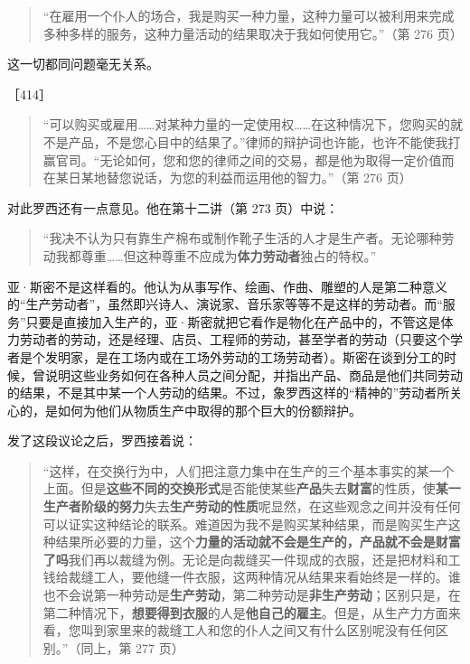 \begin{quote}“在雇用一个仆人的场合，我是购买一种力量，这种力量可以被利用来完成多种多样的服务，这种力量活动的结果取决于我如何使用它。”（第 276 页）\end{quote}

这一切都同问题毫无关系。

［414］

\begin{quote}“可以购买或雇用……对某种力量的一定使用权……在这种情况下，您购买的就不是产品，不是您心目中的结果了。”律师的辩护词也许能，也许不能使我打赢官司。“无论如何，您和您的律师之间的交易，都是他为取得一定价值而在某日某地替您说话，为您的利益而运用他的智力。”（第 276 页）\end{quote}

\fontbox{~\{}对此罗西还有一点意见。他在第十二讲（第 273 页）中说：

\begin{quote}“我决不认为只有靠生产棉布或制作靴子生活的人才是生产者。无论哪种劳动我都尊重……但这种尊重不应成为\textbf{体力劳动者}独占的特权。”\end{quote}

亚·斯密不是这样看的。他认为从事写作、绘画、作曲、雕塑的人是第二种意义的“生产劳动者”，虽然即兴诗人、演说家、音乐家等等不是这样的劳动者。而“服务”只要是直接加入生产的，亚·斯密就把它看作是物化在产品中的，不管这是体力劳动者的劳动，还是经理、店员、工程师的劳动，甚至学者的劳动（只要这个学者是个发明家，是在工场内或在工场外劳动的工场劳动者）。斯密在谈到分工的时候，曾说明这些业务如何在各种人员之间分配，并指出产品、商品是他们共同劳动的结果，不是其中某一个人劳动的结果。不过，象罗西这样的“精神的”劳动者所关心的，是如何为他们从物质生产中取得的那个巨大的份额辩护。\fontbox{\}~}

发了这段议论之后，罗西接着说：

\begin{quote}“这样，在交换行为中，人们把注意力集中在生产的三个基本事实的某一个上面。但是\textbf{这些不同的交换形式}是否能使某些\textbf{产品}失去\textbf{财富}的性质，使\textbf{某一生产者阶级的努力}失去\textbf{生产劳动的性质}呢显然，在这些观念之间并没有任何可以证实这种结论的联系。难道因为我不是购买某种结果，而是购买生产这种结果所必要的力量，这个\textbf{力量的活动就不会是生产的，产品就不会是财富了吗}我们再以裁缝为例。无论是向裁缝买一件现成的衣服，还是把材料和工钱给裁缝工人，要他缝一件衣服，这两种情况从结果来看始终是一样的。谁也不会说第一种劳动是\textbf{生产劳动}，第二种劳动是\textbf{非生产劳动}；区别只是，在第二种情况下，\textbf{想要得到衣服}的人是\textbf{他自己的雇主}。但是，从生产力方面来看，您叫到家里来的裁缝工人和您的仆人之间又有什么区别呢没有任何区别。”（同上，第 277 页）\end{quote}

